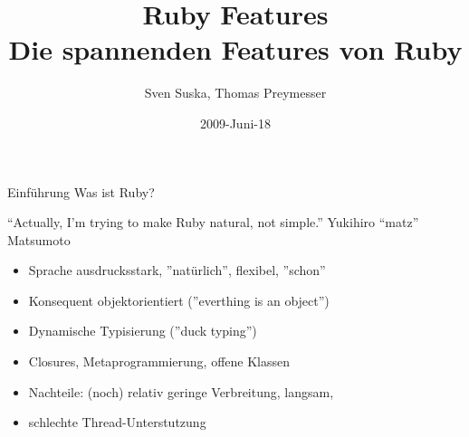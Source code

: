 \documentclass{beamer}
\title[Ruby]{Ruby Features\\Die spannenden Features von Ruby}
\author{Sven Suska, Thomas Preymesser}
\date{2009-Juni-18}
\begin{document}
\begin{frame}
\titlepage
\end{frame}


\begin{frame}{Einführung}
Was ist Ruby?

“Actually, I'm trying to make Ruby natural, not simple.”
Yukihiro “matz” Matsumoto


\begin{itemize}
\pause \item Sprache ausdrucksstark, ''natürlich'', flexibel, ''schon''
\pause \item Konsequent objektorientiert (''everthing is an object'')
\pause \item Dynamische Typisierung (''duck typing'')
\pause \item Closures, Metaprogrammierung, offene Klassen
\pause \item Nachteile: (noch) relativ geringe Verbreitung, langsam, 
\pause \item schlechte Thread-Unterstutzung
\end{itemize}
\end{frame}
\end{document}
